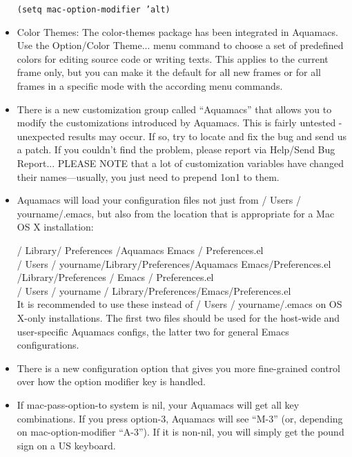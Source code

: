 \begin{itemize}
   \texttt{(setq mac-option-modifier 'alt)}


\item Color Themes: The color-themes package has been integrated in
    Aquamacs. Use the Option/Color Theme... menu command to choose a
    set of predefined colors for editing source code or writing
    texts. This applies to the current frame only, but you can make it
    the default for all new frames or for all frames in a specific
    mode with the according menu commands.

\item There is a new customization group called ``Aquamacs'' that
    allows you to modify the customizations introduced by Aquamacs.
    This is fairly untested - unexpected results may occur. If so, try
    to locate and fix the bug and send us a patch. If you couldn't
    find the problem, please report via Help/Send Bug Report...
    PLEASE NOTE that a lot of customization variables have changed
    their names---usually, you just need to prepend 1on1  to them.

\item Aquamacs will load your configuration files not just from
    / Users / yourname/.emacs, but also from the location that is appropriate for a Mac
    OS X installation:

/ Library/ Preferences /Aquamacs Emacs / Preferences.el\\
/ Users / yourname/Library/Preferences/Aquamacs Emacs/Preferences.el\\
  /Library/Preferences / Emacs / Preferences.el\\
 / Users / yourname / Library/Preferences/Emacs/Preferences.el\\

    It is recommended to use these instead of / Users / yourname/.emacs on OS X-only
    installations. The first two files should be used for the
    host-wide and user-specific Aquamacs configs, the latter two for
    general Emacs configurations.

\item There is a new configuration option that gives you more fine-grained
    control over how the option modifier key is handled.

\item If mac-pass-option-to system is nil, your Aquamacs will get all key
    combinations. If you press option-3, Aquamacs will see ``M-3'' (or,
    depending on mac-option-modifier ``A-3''). If it is non-nil, you
    will simply get the pound sign  on a US keyboard.


\end{itemize}
